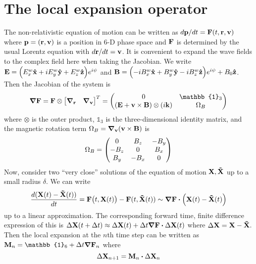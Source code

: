 
\section{The local expansion operator}\label{sec:expansion_operator}

The non-relativistic equation of motion can be written as
$d\vb{p}/dt=\vb{F}(t,\vb{r},\vb{v})$ where $\vb{p}=(\vb{r},\vb{v})$ is a
position in 6-D phase space and $\vb{F}$ is determined by the usual Lorentz
equation with $d\vb{r}/dt=\vb{v}$. It is convenient to expand the wave fields to
the complex field here when taking the Jacobian. We write
$\vb{E}=\qty(E_x^w\vb{\hat{x}}+iE_y^w\vb{\hat{y}}+E_z^w\vb{\hat{z}})e^{i\psi}$ and
$\vb{B}=\qty(-iB_x^w\vb{\hat{x}}+B_y^w\vb{\hat{y}}-iB_z^w\vb{\hat{z}})e^{i\psi}+B_0\vb{\hat{z}}$. Then the
Jacobian of the system is
\begin{equation}
    \grad\vb{F}=\vb{F}\otimes\mqty[\grad_{\vb{r}}&\grad_{\vb{v}}]^T=\mqty(0&\mathbb{1}_3\\\qty(\vb{E}+\vb{v}\times\vb{B})\otimes\qty(i\vb{k})&\Omega_B)
\end{equation}
where $\otimes$ is the outer product, $\mathbb{1}_3$ is the three-dimensional identity matrix, and the magnetic rotation term
$\Omega_B=\grad_{\vb{v}}\qty(\vb{v}\times\vb{B})$ is
\begin{equation}
    \Omega_B=\mqty(0&B_z&-B_y\\-B_z&0&B_x\\B_y&-B_x&0)
\end{equation}
Now, consider two ``very close'' solutions of the equation of
motion $\vb{X},\vb{\tilde{X}}$ up to a small radius $\delta$. We can write
\begin{equation}
    \frac{d(\vb{X}(t)-\vb{\tilde{X}}(t))}{dt}=\vb{F}\qty(t,\vb{X}(t))-\vb{F}(t,\vb{\tilde{X}}(t))\sim\grad\vb{F}\vdot\qty(\vb{X}(t)-\vb{\tilde{X}}(t))
\end{equation}
up to a linear approximation. The corresponding forward time, finite difference expression of this is
$\Delta\vb{X}(t+\Delta t)\approx\Delta\vb{X}(t)+\Delta
t\grad\vb{F}\vdot\Delta\vb{X}(t)$
where $\Delta\vb{X}=\vb{X}-\vb{\tilde{X}}$. Then the local expansion at the
$n$th time step can be written as $\vb{M}_n=\mathbb{1}_6+\Delta t\grad{\vb{F}_n}$
where
\begin{equation}\label{eq:local_expansion}
    \Delta\vb{X}_{n+1}=\vb{M}_n\vdot\Delta\vb{X}_n
\end{equation}

